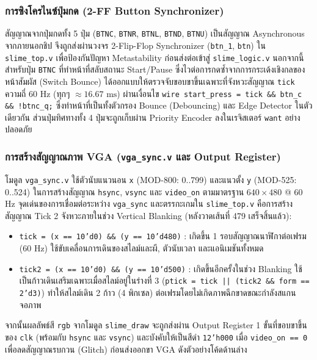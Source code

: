 \subsubsection{การซิงโครไนซ์ปุ่มกด (2-FF Button Synchronizer)}

สัญญาณจากปุ่มกดทั้ง 5 ปุ่ม (\texttt{BTNC}, \texttt{BTNR}, \texttt{BTNL}, \texttt{BTND}, \texttt{BTNU}) เป็นสัญญาณ Asynchronous จากภายนอกชิป จึงถูกส่งผ่านวงจร 2-Flip-Flop Synchronizer (\texttt{btn\_1}, \texttt{btn}) ใน \texttt{slime\_top.v} เพื่อป้องกันปัญหา Metastability ก่อนส่งต่อเข้าสู่ \texttt{slime\_logic.v} นอกจากนี้ สำหรับปุ่ม \texttt{BTNC} ที่ทำหน้าที่สลับสถานะ Start/Pause ซึ่งไวต่อการกดซ้ำจากการกระเด้งเชิงกลของหน้าสัมผัส (Switch Bounce) ได้ออกแบบให้ตรวจจับขอบขาขึ้นเฉพาะที่จังหวะสัญญาณ \texttt{tick} ความถี่ 60 Hz (ทุกๆ $\approx 16.67\text{ ms}$) ผ่านเงื่อนไข \texttt{wire start\_press = tick \&\& btn\_c \&\& !btnc\_q;} ซึ่งทำหน้าที่เป็นทั้งตัวกรอง Bounce (Debouncing) และ Edge Detector ในตัวเดียวกัน ส่วนปุ่มทิศทางทั้ง 4 ปุ่มจะถูกเก็บผ่าน Priority Encoder ลงในเรจิสเตอร์ \texttt{want} อย่างปลอดภัย

\subsubsection{การสร้างสัญญาณภาพ VGA (\texttt{vga\_sync.v} และ Output Register)}

โมดูล \texttt{vga\_sync.v} ใช้ตัวนับแนวนอน \texttt{x} (MOD-800: 0..799) และแนวตั้ง \texttt{y} (MOD-525: 0..524) ในการสร้างสัญญาณ \texttt{hsync}, \texttt{vsync} และ \texttt{video\_on} ตามมาตรฐาน $640\times480$ @ 60 Hz จุดเด่นของการเชื่อมต่อระหว่าง \texttt{vga\_sync} และตรรกะเกมใน \texttt{slime\_top.v} คือการสร้างสัญญาณ Tick 2 จังหวะภายในช่วง Vertical Blanking (หลังวาดเส้นที่ 479 เสร็จสิ้นแล้ว):
\begin{itemize}[leftmargin=1.5cm]
    \item \texttt{tick = (x == 10'd0) \&\& (y == 10'd480)} : เกิดขึ้น 1 รอบสัญญาณนาฬิกาต่อเฟรม (60 Hz) ใช้ขับเคลื่อนการเดินของสไลม์และผี, ตัวนับเวลา และแอนิเมชันทั้งหมด
    \item \texttt{tick2 = (x == 10'd0) \&\& (y == 10'd500)} : เกิดขึ้นอีกครั้งในช่วง Blanking ใช้เป็นก้าวเดินเสริมเฉพาะเมื่อสไลม์อยู่ในร่างที่ 3 (\texttt{ptick = tick || (tick2 \&\& form == 2'd3)}) ทำให้สไลม์เดิน 2 ก้าว (4 พิกเซล) ต่อเฟรมโดยไม่เกิดภาพฉีกขาดขณะกำลังสแกนจอภาพ
\end{itemize}
จากนั้นผลลัพธ์สี \texttt{rgb} จากโมดูล \texttt{slime\_draw} จะถูกส่งผ่าน Output Register 1 ขั้นที่ขอบขาขึ้นของ \texttt{clk} (พร้อมกับ \texttt{hsync} และ \texttt{vsync}) และบังคับให้เป็นสีดำ \texttt{12'h000} เมื่อ \texttt{video\_on == 0} เพื่อลดสัญญาณรบกวน (Glitch) ก่อนส่งออกขา VGA ดังตัวอย่างโค้ดด้านล่าง

